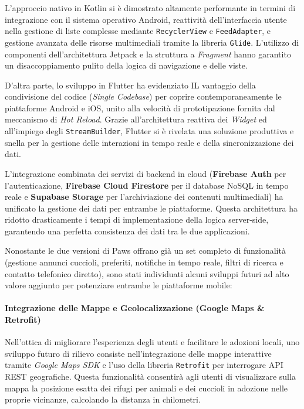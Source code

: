 \documentclass[a4paper]{report}
\begin{document}
\noindent L’approccio nativo in Kotlin si è dimostrato altamente performante in termini di integrazione con il sistema operativo Android, reattività dell'interfaccia utente nella gestione di liste complesse mediante \texttt{RecyclerView} e \texttt{FeedAdapter}, e gestione avanzata delle risorse multimediali tramite la libreria \texttt{Glide}. L'utilizzo di componenti dell'architettura Jetpack e la struttura a \textit{Fragment} hanno garantito un disaccoppiamento pulito della logica di navigazione e delle viste.

\noindent D’altra parte, lo sviluppo in Flutter ha evidenziato IL vantaggio della condivisione del codice (\textit{Single Codebase}) per coprire contemporaneamente le piattaforme Android e iOS, unito alla velocità di prototipazione fornita dal meccanismo di \textit{Hot Reload}. Grazie all'architettura reattiva dei \textit{Widget} ed all'impiego degli \texttt{StreamBuilder}, Flutter si è rivelata una soluzione produttiva e snella per la gestione delle interazioni in tempo reale e della sincronizzazione dei dati.

\noindent L’integrazione combinata dei servizi di backend in cloud (\textbf{Firebase Auth} per l'autenticazione, \textbf{Firebase Cloud Firestore} per il database NoSQL in tempo reale e \textbf{Supabase Storage} per l'archiviazione dei contenuti multimediali) ha unificato la gestione dei dati per entrambe le piattaforme. Questa architettura ha ridotto drasticamente i tempi di implementazione della logica server-side, garantendo una perfetta consistenza dei dati tra le due applicazioni.

Nonostante le due versioni di Paws offrano già un set completo di funzionalità (gestione annunci cuccioli, preferiti, notifiche in tempo reale, filtri di ricerca e contatto telefonico diretto), sono stati individuati alcuni sviluppi futuri ad alto valore aggiunto per potenziare entrambe le piattaforme mobile:
\paragraph{Integrazione delle Mappe e Geolocalizzazione (Google Maps \& Retrofit)}
Nell’ottica di migliorare l’esperienza degli utenti e facilitare le adozioni locali, uno sviluppo futuro di rilievo consiste nell’integrazione delle mappe interattive tramite \textit{Google Maps SDK} e l'uso della libreria \texttt{Retrofit} per interrogare API REST geografiche. Questa funzionalità consentirà agli utenti di visualizzare sulla mappa la posizione esatta dei rifugi per animali e dei cuccioli in adozione nelle proprie vicinanze, calcolando la distanza in chilometri.
\end{document}
